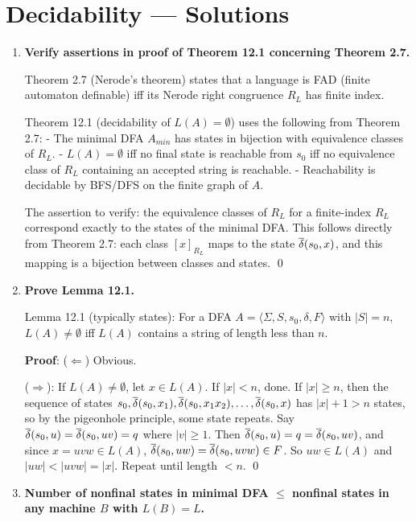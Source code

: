 
\chapter{Decidability --- Solutions}

\begin{enumerate}[{12.}1. ]

\item \textbf{Verify assertions in proof of Theorem 12.1 concerning Theorem 2.7.}

Theorem 2.7 (Nerode's theorem) states that a language is FAD (finite automaton definable) iff its Nerode right congruence $R_L$ has finite index.

Theorem 12.1 (decidability of $L(A)=\emptyset$) uses the following from Theorem 2.7:
- The minimal DFA $A_{min}$ has states in bijection with equivalence classes of $R_L$.
- $L(A)=\emptyset$ iff no final state is reachable from $s_0$ iff no equivalence class of $R_L$ containing an accepted string is reachable.
- Reachability is decidable by BFS/DFS on the finite graph of $A$.

The assertion to verify: the equivalence classes of $R_L$ for a finite-index $R_L$ correspond exactly to the states of the minimal DFA. This follows directly from Theorem 2.7: each class $[x]_{R_L}$ maps to the state $\overline{\delta}(s_0,x)$, and this mapping is a bijection between classes and states. \qed

\item \textbf{Prove Lemma 12.1.}

Lemma 12.1 (typically states): For a DFA $A = \langle\Sigma,S,s_0,\delta,F\rangle$ with $|S|=n$, $L(A)\neq\emptyset$ iff $L(A)$ contains a string of length less than $n$.

\textbf{Proof}: ($\Leftarrow$) Obvious.

($\Rightarrow$): If $L(A)\neq\emptyset$, let $x\in L(A)$. If $|x|<n$, done. If $|x|\geq n$, then the sequence of states $s_0, \overline{\delta}(s_0,x_1),\overline{\delta}(s_0,x_1x_2),\ldots,\overline{\delta}(s_0,x)$ has $|x|+1>n$ states, so by the pigeonhole principle, some state repeats. Say $\overline{\delta}(s_0,u)=\overline{\delta}(s_0,uv)=q$ where $|v|\geq 1$. Then $\overline{\delta}(s_0,u) = q = \overline{\delta}(s_0,uv)$, and since $x=uvw\in L(A)$, $\overline{\delta}(s_0,uw)=\overline{\delta}(s_0,uvw)\in F$. So $uw\in L(A)$ and $|uw|<|uvw|=|x|$. Repeat until length $<n$. \qed

\item \textbf{Number of nonfinal states in minimal DFA $\leq$ nonfinal states in any machine $B$ with $L(B)=L$.}


\end{enumerate}
